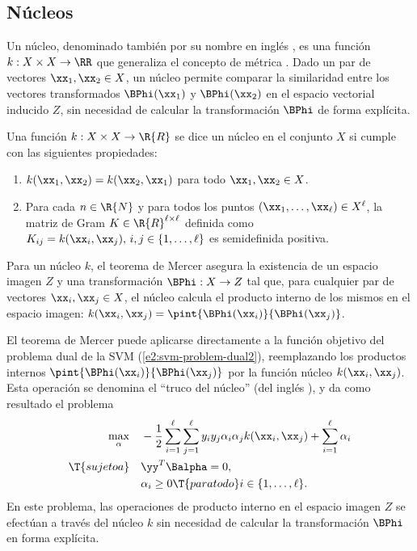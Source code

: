 %
%
\subsection{Núcleos}
%
Un núcleo, denominado también por su nombre en inglés , es
una función $k:X\times{}X\rightarrow{}\RR$ que generaliza el concepto
de métrica \cite{stewart}.
Dado un par de vectores $\xx_1,\xx_2\in{}X$, un núcleo permite
comparar la similaridad entre los vectores {transformados}
$\BPhi(\xx_1)$ y $\BPhi(\xx_2)$ en el espacio vectorial inducido $Z$,
sin necesidad de calcular la transformación $\BPhi$ de forma
explícita.
%
\begin{definicion}[Núcleo]
  Una función $k:X\times{}X\rightarrow{}\R{R}$ se dice un núcleo
  en el conjunto $X$ si cumple con las siguientes propiedades:
  \begin{enumerate}
  \item $k(\xx_1,\xx_2)=k(\xx_2,\xx_1)$ para todo $\xx_1,\xx_2\in{}X$.
  \item Para cada $n\in\R{N}$ y para todos los puntos
    $(\xx_1,\ldots,\xx_\ell)\in{}X^\ell$, la matriz de Gram
    $K\in\R{R}^{\ell\times\ell}$ definida como
    $K_{ij}=k(\xx_i,\xx_j),\,i,j\in\{1,\ldots,\ell\}$ es semidefinida
    positiva.
  \end{enumerate}
\end{definicion}
%
Para un núcleo $k$, el teorema de Mercer \cite{mercer} asegura la
existencia de un espacio imagen $Z$ y una transformación
$\BPhi:X\rightarrow{}Z$ tal que, para cualquier par de vectores
$\xx_i,\xx_j\in{}X$, el núcleo calcula el producto interno de los
mismos en el espacio imagen:
$k(\xx_i,\xx_j)=\pint{\BPhi(\xx_i)}{\BPhi(\xx_j)}$.

El teorema de Mercer puede aplicarse directamente a la función
objetivo del problema dual de la SVM (\ref{e2:svm-problem-dual2}),
reemplazando los productos internos
$\pint{\BPhi(\xx_i)}{\BPhi(\xx_j)}$ por la función núcleo
$k(\xx_i,\xx_j)$.
Esta operación se denomina el ``truco del núcleo'' (del inglés
), y da como resultado el problema
%
\begin{align}
  \begin{split}
    \max_\alpha &\quad
    -\frac{1}{2}\sum_{i=1}^\ell\sum_{j=1}^\ell y_iy_j\alpha_i\alpha_j
    k(\xx_i,\xx_j) + \sum_{i=1}^{\ell} \alpha_i \\
    \T{sujeto a} &\quad \yy^T\Balpha = 0, \\
    &\quad \alpha_i \geq 0\T{ para todo } i\in\{1,\ldots,\ell\}.
  \end{split}
  \label{e2:svm-problem-kernel}
\end{align}
%
En este problema, las operaciones de producto interno en el espacio
imagen $Z$ se efectúan a través del núcleo $k$ sin necesidad de
calcular la transformación $\BPhi$ en forma explícita.

